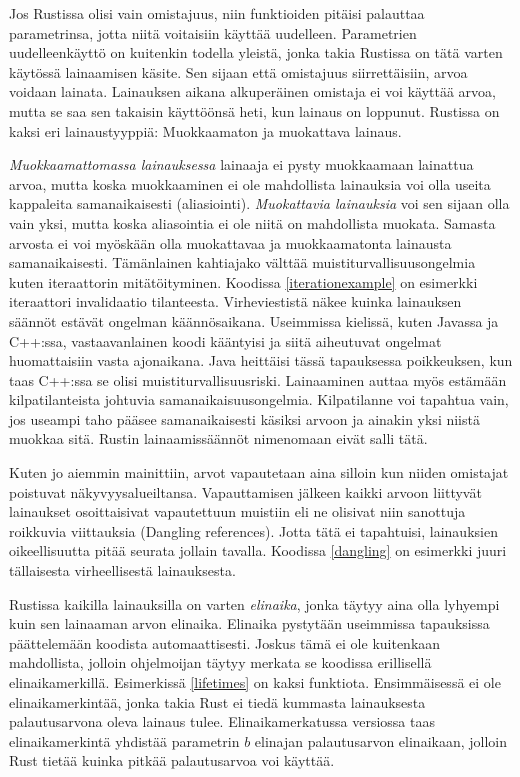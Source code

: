 \documentclass[finnish]{tktltiki2}
\theoremstyle{definition}
\theoremstyle{remark}
\begin{document}
Jos Rustissa olisi vain omistajuus, niin funktioiden pitäisi palauttaa parametrinsa, jotta niitä voitaisiin käyttää uudelleen. Parametrien uudelleenkäyttö on kuitenkin todella yleistä, jonka takia Rustissa on tätä varten käytössä lainaamisen käsite. Sen sijaan että omistajuus siirrettäisiin, arvoa voidaan lainata. Lainauksen aikana alkuperäinen omistaja ei voi käyttää arvoa, mutta se saa sen takaisin käyttöönsä heti, kun lainaus on loppunut. Rustissa on kaksi eri lainaustyyppiä: Muokkaamaton ja muokattava lainaus.

\textit{Muokkaamattomassa lainauksessa} lainaaja ei pysty muokkaamaan lainattua arvoa, mutta koska muokkaaminen ei ole mahdollista lainauksia voi olla useita kappaleita samanaikaisesti (aliasiointi). \textit{Muokattavia lainauksia} voi sen sijaan olla vain yksi, mutta koska aliasointia ei ole niitä on mahdollista muokata. Samasta arvosta ei voi myöskään olla muokattavaa ja muokkaamatonta lainausta samanaikaisesti. Tämänlainen kahtiajako välttää muistiturvallisuusongelmia kuten iteraattorin mitätöityminen. Koodissa \ref{iterationexample} on esimerkki iteraattori invalidaatio tilanteesta. Virheviestistä näkee kuinka lainauksen säännöt estävät ongelman käännösaikana. Useimmissa kielissä, kuten Javassa ja C++:ssa, vastaavanlainen koodi kääntyisi ja siitä aiheutuvat ongelmat huomattaisiin vasta ajonaikana. Java heittäisi tässä tapauksessa poikkeuksen, kun taas C++:ssa se olisi muistiturvallisuusriski. Lainaaminen auttaa myös estämään kilpatilanteista johtuvia samanaikaisuusongelmia. Kilpatilanne voi tapahtua vain, jos useampi taho pääsee samanaikaisesti käsiksi arvoon ja ainakin yksi niistä muokkaa sitä. Rustin lainaamissäännöt nimenomaan eivät salli tätä.

Kuten jo aiemmin mainittiin, arvot vapautetaan aina silloin kun niiden omistajat poistuvat näkyvyysalueiltansa. Vapauttamisen jälkeen kaikki arvoon liittyvät lainaukset osoittaisivat vapautettuun muistiin eli ne olisivat niin sanottuja roikkuvia viittauksia (Dangling references). Jotta tätä ei tapahtuisi, lainauksien oikeellisuutta pitää seurata jollain tavalla. Koodissa \ref{dangling} on esimerkki juuri tällaisesta virheellisestä lainauksesta.

Rustissa kaikilla lainauksilla on varten \textit{elinaika}, jonka täytyy aina olla lyhyempi kuin sen lainaaman arvon elinaika. Elinaika pystytään useimmissa tapauksissa päättelemään koodista automaattisesti. Joskus tämä ei ole kuitenkaan mahdollista, jolloin ohjelmoijan täytyy merkata se koodissa erillisellä elinaikamerkillä. Esimerkissä \ref{lifetimes} on kaksi funktiota. Ensimmäisessä ei ole elinaikamerkintää, jonka takia Rust ei tiedä kummasta lainauksesta palautusarvona oleva lainaus tulee. Elinaikamerkatussa versiossa taas elinaikamerkintä yhdistää parametrin $b$ elinajan palautusarvon elinaikaan, jolloin Rust tietää kuinka pitkää palautusarvoa voi käyttää.
\end{document}
